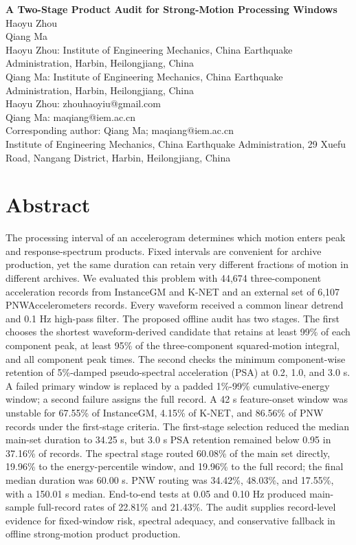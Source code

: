 \documentclass[12pt,letterpaper]{article}
\begin{document}
\begin{center}
{\Large\bfseries A Two-Stage Product Audit for Strong-Motion Processing Windows}\\[1.5em]
Haoyu Zhou\\Qiang Ma\\
\vspace{0.35em}
Haoyu Zhou: Institute of Engineering Mechanics, China Earthquake Administration, Harbin, Heilongjiang, China\\Qiang Ma: Institute of Engineering Mechanics, China Earthquake Administration, Harbin, Heilongjiang, China\\
\vspace{0.35em}
Haoyu Zhou: zhouhaoyiu@gmail.com\\Qiang Ma: maqiang@iem.ac.cn\\
\vspace{0.35em}
Corresponding author: Qiang Ma; maqiang@iem.ac.cn\\Institute of Engineering Mechanics, China Earthquake Administration, 29 Xuefu Road, Nangang District, Harbin, Heilongjiang, China\\
\end{center}
\thispagestyle{plain}

\section{Abstract}\label{abstract}

The processing interval of an accelerogram determines which motion enters peak and response-spectrum products. Fixed intervals are convenient for archive production, yet the same duration can retain very different fractions of motion in different archives. We evaluated this problem with 44,674 three-component acceleration records from InstanceGM and K-NET and an external set of 6,107 PNWAccelerometers records. Every waveform received a common linear detrend and 0.1 Hz high-pass filter. The proposed offline audit has two stages. The first chooses the shortest waveform-derived candidate that retains at least 99\% of each component peak, at least 95\% of the three-component squared-motion integral, and all component peak times. The second checks the minimum component-wise retention of 5\%-damped pseudo-spectral acceleration (PSA) at 0.2, 1.0, and 3.0 s. A failed primary window is replaced by a padded 1\%-99\% cumulative-energy window; a second failure assigns the full record. A 42 s feature-onset window was unstable for 67.55\% of InstanceGM, 4.15\% of K-NET, and 86.56\% of PNW records under the first-stage criteria. The first-stage selection reduced the median main-set duration to 34.25 s, but 3.0 s PSA retention remained below 0.95 in 37.16\% of records. The spectral stage routed 60.08\% of the main set directly, 19.96\% to the energy-percentile window, and 19.96\% to the full record; the final median duration was 60.00 s. PNW routing was 34.42\%, 48.03\%, and 17.55\%, with a 150.01 s median. End-to-end tests at 0.05 and 0.10 Hz produced main-sample full-record rates of 22.81\% and 21.43\%. The audit supplies record-level evidence for fixed-window risk, spectral adequacy, and conservative fallback in offline strong-motion product production.
\end{document}
